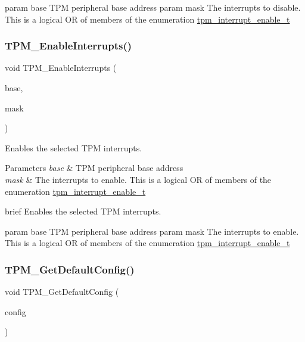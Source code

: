 param base T\+PM peripheral base address param mask The interrupts to disable. This is a logical OR of members of the enumeration \mbox{\hyperlink{group__tpm_ga95c8edaff8d8b474bf4796b16413cc16}{tpm\+\_\+interrupt\+\_\+enable\+\_\+t}} \mbox{\label{group__tpm_ga1e6563023f023ee826e687d3668b4247}} 
\subsubsection{\texorpdfstring{TPM\_EnableInterrupts()}{TPM\_EnableInterrupts()}}
{\footnotesize\ttfamily void T\+P\+M\+\_\+\+Enable\+Interrupts (\begin{DoxyParamCaption}\item[{\mbox{\hyperlink{struct_t_p_m___type}{T\+P\+M\+\_\+\+Type}} $\ast$}]{base,  }\item[{uint32\+\_\+t}]{mask }\end{DoxyParamCaption})}



Enables the selected T\+PM interrupts. 


\begin{DoxyParams}{Parameters}
{\em base} & T\+PM peripheral base address \\
\hline
{\em mask} & The interrupts to enable. This is a logical OR of members of the enumeration \mbox{\hyperlink{group__tpm_ga95c8edaff8d8b474bf4796b16413cc16}{tpm\+\_\+interrupt\+\_\+enable\+\_\+t}}\\
\hline
\end{DoxyParams}
brief Enables the selected T\+PM interrupts.

param base T\+PM peripheral base address param mask The interrupts to enable. This is a logical OR of members of the enumeration \mbox{\hyperlink{group__tpm_ga95c8edaff8d8b474bf4796b16413cc16}{tpm\+\_\+interrupt\+\_\+enable\+\_\+t}} \mbox{\label{group__tpm_ga53fcb634d4c70d9bcb14c972944d949f}} 
\subsubsection{\texorpdfstring{TPM\_GetDefaultConfig()}{TPM\_GetDefaultConfig()}}
{\footnotesize\ttfamily void T\+P\+M\+\_\+\+Get\+Default\+Config (\begin{DoxyParamCaption}\item[{\mbox{\hyperlink{group__tpm_ga5647039a18486c876df5cdeb84c9621d}{tpm\+\_\+config\+\_\+t}} $\ast$}]{config }\end{DoxyParamCaption})}



